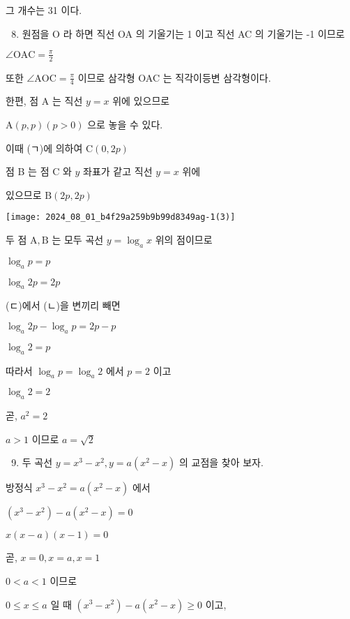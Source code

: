 \documentclass[10pt]{article}
\begin{document}
그 개수는 31 이다.

\begin{enumerate}
  \setcounter{enumi}{7}
  \item 원점을 O 라 하면 직선 OA 의 기울기는 1 이고 직선 AC 의 기울기는 -1 이므로
\end{enumerate}

$\angle \mathrm{OAC}=\frac{\pi}{2}$

또한 $\angle \mathrm{AOC}=\frac{\pi}{4}$ 이므로 삼각형 OAC 는 직각이등변 삼각형이다.

한편, 점 A 는 직선 $y=x$ 위에 있으므로

$\mathrm{A}(p, p)(p>0)$ 으로 놓을 수 있다.

이때 (ㄱ)에 의하여 $\mathrm{C}(0,2 p)$

점 B 는 점 C 와 $y$ 좌표가 같고 직선 $y=x$ 위에

있으므로 $\mathrm{B}(2 p, 2 p)$

\begin{center}
\texttt{[image: 2024\_08\_01\_b4f29a259b9b99d8349ag-1(3)]}
\end{center}

두 점 $\mathrm{A}, \mathrm{B}$ 는 모두 곡선 $y=\log _{a} x$ 위의 점이므로

$\log _{a} p=p$

$\log _{a} 2 p=2 p$

(ㄷ)에서 (ㄴ)을 변끼리 빼면

$\log _{a} 2 p-\log _{a} p=2 p-p$

$\log _{a} 2=p$

따라서 $\log _{a} p=\log _{a} 2$ 에서 $p=2$ 이고

$\log _{a} 2=2$

곧, $a^{2}=2$

$a>1$ 이므로 $a=\sqrt{2}$

\begin{enumerate}
  \setcounter{enumi}{8}
  \item 두 곡선 $y=x^{3}-x^{2}, y=a\left(x^{2}-x\right)$ 의 교점을 찾아 보자.
\end{enumerate}

방정식 $x^{3}-x^{2}=a\left(x^{2}-x\right)$ 에서

$\left(x^{3}-x^{2}\right)-a\left(x^{2}-x\right)=0$

$x(x-a)(x-1)=0$

곧, $x=0, x=a, x=1$

$0<a<1$ 이므로

$0 \leq x \leq a$ 일 때 $\left(x^{3}-x^{2}\right)-a\left(x^{2}-x\right) \geq 0$ 이고,
\end{document}
